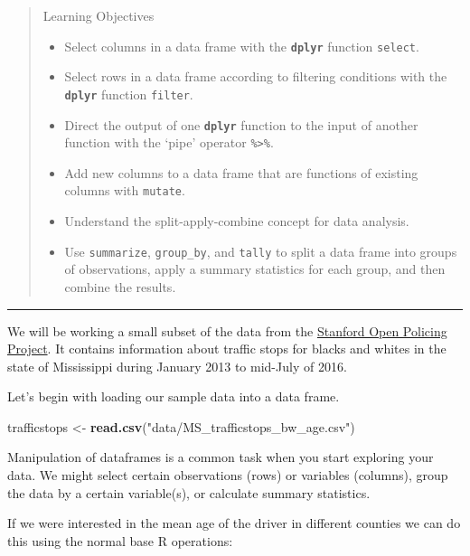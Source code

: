 \documentclass[]{book}
\newenvironment{Shaded}{\begin{snugshade}}{\end{snugshade}}
\newcommand{\KeywordTok}[1]{\textcolor[rgb]{0.13,0.29,0.53}{\textbf{#1}}}
\newcommand{\StringTok}[1]{\textcolor[rgb]{0.31,0.60,0.02}{#1}}
\newcommand{\NormalTok}[1]{#1}
\providecommand{\tightlist}{%
  \setlength{\itemsep}{0pt}\setlength{\parskip}{0pt}}
\theoremstyle{definition}
\theoremstyle{definition}
\theoremstyle{definition}
\theoremstyle{remark}
\begin{document}
\begin{quote}
Learning Objectives

\begin{itemize}
\tightlist
\item
  Select columns in a data frame with the \textbf{\texttt{dplyr}}
  function \texttt{select}.
\item
  Select rows in a data frame according to filtering conditions with the
  \textbf{\texttt{dplyr}} function \texttt{filter}.
\item
  Direct the output of one \textbf{\texttt{dplyr}} function to the input
  of another function with the `pipe' operator
  \texttt{\%\textgreater{}\%}.
\item
  Add new columns to a data frame that are functions of existing columns
  with \texttt{mutate}.
\item
  Understand the split-apply-combine concept for data analysis.
\item
  Use \texttt{summarize}, \texttt{group\_by}, and \texttt{tally} to
  split a data frame into groups of observations, apply a summary
  statistics for each group, and then combine the results.
\end{itemize}
\end{quote}

\begin{center}\rule{0.5\linewidth}{\linethickness}\end{center}

We will be working a small subset of the data from the
\href{https://openpolicing.stanford.edu}{Stanford Open Policing
Project}. It contains information about traffic stops for blacks and
whites in the state of Mississippi during January 2013 to mid-July of
2016.

Let's begin with loading our sample data into a data frame.

\begin{Shaded}
\begin{Highlighting}[]
\NormalTok{trafficstops <-}\StringTok{ }\KeywordTok{read.csv}\NormalTok{(}\StringTok{"data/MS_trafficstops_bw_age.csv"}\NormalTok{)}
\end{Highlighting}
\end{Shaded}

Manipulation of dataframes is a common task when you start exploring
your data. We might select certain observations (rows) or variables
(columns), group the data by a certain variable(s), or calculate summary
statistics.

If we were interested in the mean age of the driver in different
counties we can do this using the normal base R operations:
\end{document}
